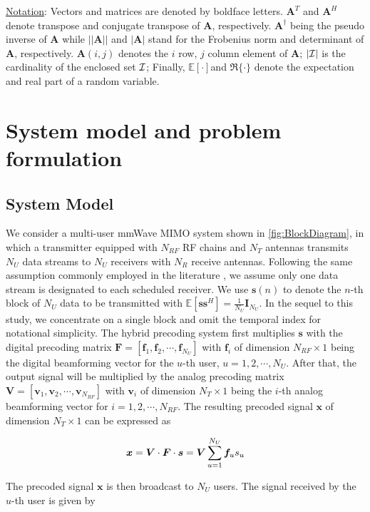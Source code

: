 \documentclass[conference]{IEEEtran}
\begin{document}
\underline{Notation}: Vectors and matrices are denoted by boldface letters. ${\bm A}^T$ and ${\bm A}^H$ denote transpose and conjugate transpose of ${\bm A}$, respectively. $\bm{A}^\dagger$ being the pseudo inverse of $\bm{A}$ while $||\bm{A}|| $ and $|\bm{A}|$ stand for the Frobenius norm and determinant of ${\bm A}$, respectively. $\bm{A}(i,j)$ denotes the $i$ row, $j$ column element of ${\bm A}$; $|\cal{I}|$ is the cardinality of the enclosed set ${\cal I}$; Finally, $\mathbb{E}[ \cdot] $and $\Re\{\cdot\}$ denote the expectation and real part of a random variable.

\section{System model and problem formulation}
\subsection{System Model}
We consider a multi-user mmWave MIMO system shown in \figurename{\ref{fig:BlockDiagram}}, in which a transmitter equipped with $N_{RF}$ RF chains and $N_T$ antennas transmits $N_U$ data streams to $N_U$ receivers with $N_R$ receive antennas. Following the same assumption commonly employed in the literature \cite{alkhateeb2015limited}, we assume only one data stream is designated to each scheduled receiver. We use ${\bm s}(n)$ to denote the $n$-th block of $N_U$ data to be transmitted with $\mathbb{E}\left[\bm{ss}^H\right]=\frac{1}{N_U}\bm{I}_{N_U}$. In the sequel to this study, we concentrate on a single block and omit the temporal index for notational simplicity. The hybrid precoding system first multiplies ${\bm s}$ with the digital precoding matrix $\bm{F}=\left[{\bm f}_1,{\bm f}_2,\cdots,{\bm f}_{N_U}\right]$ with ${\bm f}_i$ of dimension $N_{RF}\times 1$ being the digital beamforming vector for the $u$-th user, $u=1,2,\cdots,N_U$. After that, the output signal will be multiplied by the analog precoding matrix $\bm{V}=\left[{\bm v}_1,{\bm v}_2,\cdots,{\bm v}_{N_{RF}}\right]$ with ${\bm v}_i$ of dimension $N_T\times 1$ being the $i$-th analog beamforming vector for $i=1,2,\cdots,N_{RF}$. The resulting precoded signal $\bm x$ of dimension $N_T\times 1$  can be expressed as

\begin{equation}{\label{eq:transx1}}
{\bm x} = \bm{V}\cdot \bm{F}\cdot\bm{s}= \bm{V}\sum_{u=1}^{N_U}\bm{f}_us_u
\end{equation}

The precoded signal $\bm x$ is then broadcast to $N_U$ users. The signal received by the $u$-th user is given by
\end{document}
